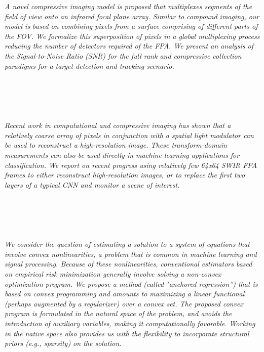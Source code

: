   \begin{multicols}{2}
      \textit{A novel compressive imaging model is proposed that multiplexes segments of the field of view onto an infrared focal plane array.  Similar to compound imaging, our model is based on combining pixels from a surface comprising of different parts of the FOV.  We formalize this superposition of pixels in a global multiplexing process reducing the number of detectors required of the FPA.  We present an analysis of the Signal-to-Noise Ratio (SNR) for the full rank and compressive collection paradigms for a target detection and tracking scenario. }\\
\\ 
        \\
        \\\\
\\
      \textit{Recent work in computational and compressive imaging has shown that a relatively coarse array of pixels in conjunction with a spatial light modulator can be used to reconstruct a high-resolution image. These transform-domain measurements can also be used directly in machine learning applications for classification. We report on recent progress using relatively few 64x64 SWIR FPA frames to either reconstruct high-resolution images, or to replace the first two layers of a typical CNN and monitor a scene of interest.}\\
\\ 
        \\
        \\\\
\\
      \textit{We consider the question of estimating a solution to a system of equations that involve convex nonlinearities, a problem that is common in machine learning and signal processing. Because of these nonlinearities, conventional estimators based on empirical risk minimization generally involve solving a non-convex optimization program. We propose a method (called "anchored regression”) that is based on convex programming and amounts to maximizing a linear functional (perhaps augmented by a regularizer) over a convex set. 
The proposed convex program is formulated in the natural space of the problem, and avoids the introduction of auxiliary variables, making it computationally favorable. Working in the native space also provides us with the flexibility to incorporate structural priors (e.g., sparsity) on the solution.
}
\end{multicols}
